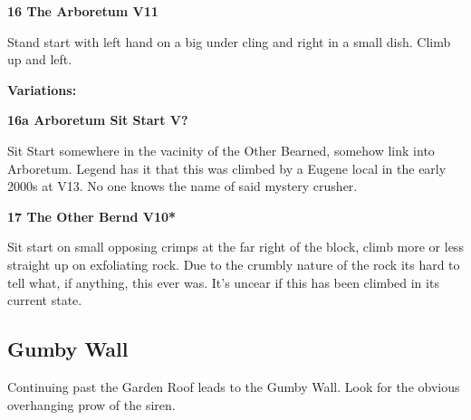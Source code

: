 \begin{multicols}{2}
			
			
			\needspace{1.5cm}
\label{rt:The Arboretum}
\colorbox{red!20}{
\parbox{0.95\linewidth}{
\textbf{
16 The Arboretum V11  
}}}

			\begin{adjustwidth}{0.5cm}{}			
			Stand start with left hand on a big under cling and right in a small dish. Climb up and left.
			\end{adjustwidth}
			
				\begin{adjustwidth}{0.5cm}{}				
				\needspace{3cm}
				\textbf{Variations:} \newline
					
					\needspace{1.5cm}
\label{vr:Arboretum Sit Start}
\colorbox{black!20}{
\parbox{0.95\linewidth}{
\textbf{
16a Arboretum Sit Start V?  
}}}

					\begin{adjustwidth}{0.5cm}{}			
					Sit Start somewhere in the vacinity of the Other Bearned, somehow link into Arboretum. Legend has it that this was climbed by a Eugene local in the early 2000s at V13. No one knows the name of said mystery crusher.
					\end{adjustwidth}
					
					
				\end{adjustwidth}
			
			
			\needspace{1.5cm}
\label{rt:The Other Bernd}
\colorbox{red!20}{
\parbox{0.95\linewidth}{
\textbf{
17 The Other Bernd V10*  
}}}

			\begin{adjustwidth}{0.5cm}{}			
			Sit start on small opposing crimps at the far right of the block, climb more or less straight up on exfoliating rock. Due to the crumbly nature of the rock its hard to tell what, if anything, this ever was. It's uncear if this has been climbed in its current state.
			\end{adjustwidth}
			
			
		


		\needspace{1.5cm}
		\subsection*{Gumby Wall}\label{bf:Gumby Wall}
		Continuing past the Garden Roof leads to the Gumby Wall. Look for the obvious overhanging prow of the siren.\\
	

\end{multicols}
